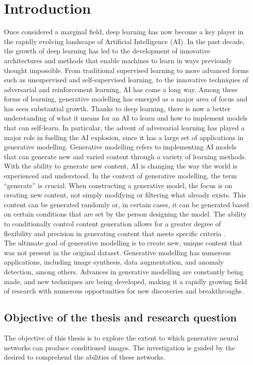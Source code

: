 \section{Introduction}
\label{section:IntroductionChapter}
Once considered a marginal field, deep learning has now become a key player in the rapidly evolving landscape of Artificial Intelligence (AI). In the past decade, the growth of deep learning has led to the development of innovative architectures and methods that enable machines to learn in ways previously thought impossible. From traditional supervised learning to more advanced forms such as unsupervised and self-supervised learning, to the innovative techniques of adversarial and reinforcement learning, AI has come a long way. Among these forms of learning, generative modelling has emerged as a major area of focus and has seen substantial growth. Thanks to deep learning, there is now a better understanding of what it means for an AI to learn and how to implement models that can self-learn. In particular, the advent of adversarial learning has played a major role in fuelling the AI explosion, since it has a large set of applications in generative modelling. Generative modelling refers to implementing AI models that can generate new and varied content through a variety of learning methods. With the ability to generate new content, AI is changing the way the world is experienced and understood. In the context of generative modelling, the term “generate” is crucial. When constructing a generative model, the focus is on creating new content, not simply modifying or filtering what already exists. This content can be generated randomly or, in certain cases, it can be generated based on certain conditions that are set by the person designing the model. The ability to conditionally control content generation allows for a greater degree of flexibility and precision in generating content that meets specific criteria \cite{GeneratingNewRealityBook}.\\
The ultimate goal of generative modelling is to create new, unique content that was not present in the original dataset. Generative modelling has numerous applications, including image synthesis, data augmentation, and anomaly detection, among others. Advances in generative modelling are constantly being made, and new techniques are being developed, making it a rapidly growing field of research with numerous opportunities for new discoveries and breakthroughs.

\subsection{Objective of the thesis and research question}
The objective of this thesis is to explore the extent to which generative neural networks can produce conditioned images. The investigation is guided by the desired to comprehend the abilities of these networks.

